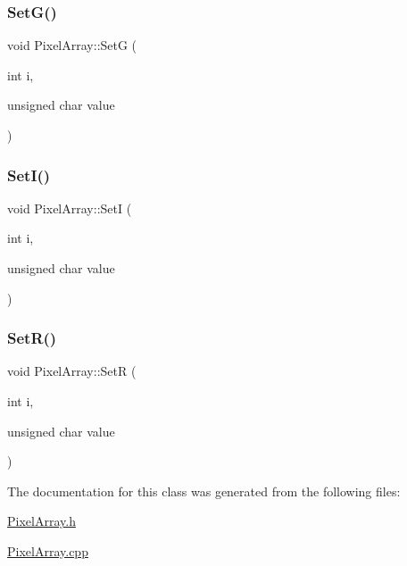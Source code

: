 \mbox{\label{class_pixel_array_a60ea8084ec95df0d51f46c9b0ff308d5}} 
\subsubsection{\texorpdfstring{Set\+G()}{SetG()}}
{\footnotesize\ttfamily void Pixel\+Array\+::\+SetG (\begin{DoxyParamCaption}\item[{int}]{i,  }\item[{unsigned char}]{value }\end{DoxyParamCaption})}

\mbox{\label{class_pixel_array_afbfac74c674f63d793d85141d3a3b046}} 
\subsubsection{\texorpdfstring{Set\+I()}{SetI()}}
{\footnotesize\ttfamily void Pixel\+Array\+::\+SetI (\begin{DoxyParamCaption}\item[{int}]{i,  }\item[{unsigned char}]{value }\end{DoxyParamCaption})}

\mbox{\label{class_pixel_array_abd4253e7c76f3775f31e09dfe318e3a5}} 
\subsubsection{\texorpdfstring{Set\+R()}{SetR()}}
{\footnotesize\ttfamily void Pixel\+Array\+::\+SetR (\begin{DoxyParamCaption}\item[{int}]{i,  }\item[{unsigned char}]{value }\end{DoxyParamCaption})}



The documentation for this class was generated from the following files\+:\begin{DoxyCompactItemize}
\item 
\hyperlink{_pixel_array_8h}{Pixel\+Array.\+h}\item 
\hyperlink{_pixel_array_8cpp}{Pixel\+Array.\+cpp}\end{DoxyCompactItemize}
